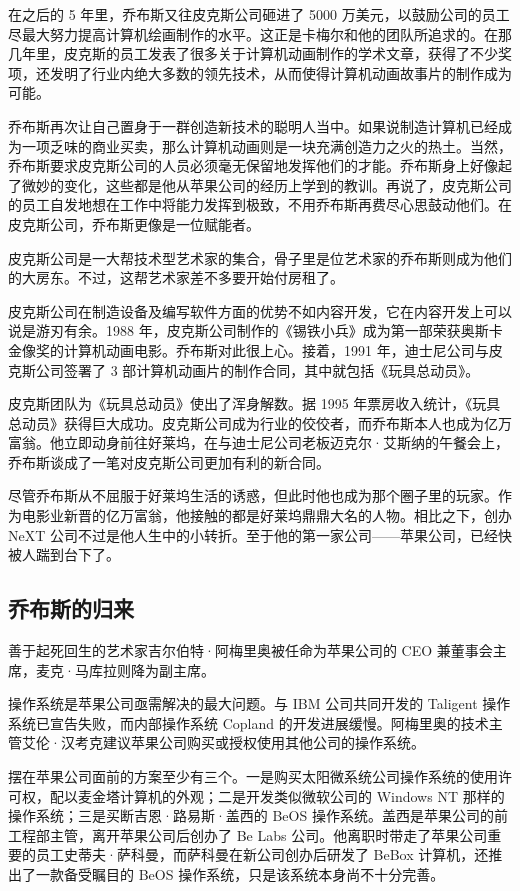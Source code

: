 \documentclass[12pt,UTF8]{ctexbook}
\begin{document}
在之后的 5 年里，乔布斯又往皮克斯公司砸进了 5000 万美元，以鼓励公司的员工尽最大努力提高计算机绘画制作的水平。这正是卡梅尔和他的团队所追求的。在那几年里，皮克斯的员工发表了很多关于计算机动画制作的学术文章，获得了不少奖项，还发明了行业内绝大多数的领先技术，从而使得计算机动画故事片的制作成为可能。

乔布斯再次让自己置身于一群创造新技术的聪明人当中。如果说制造计算机已经成为一项乏味的商业买卖，那么计算机动画则是一块充满创造力之火的热土。当然，乔布斯要求皮克斯公司的人员必须毫无保留地发挥他们的才能。乔布斯身上好像起了微妙的变化，这些都是他从苹果公司的经历上学到的教训。再说了，皮克斯公司的员工自发地想在工作中将能力发挥到极致，不用乔布斯再费尽心思鼓动他们。在皮克斯公司，乔布斯更像是一位赋能者。

皮克斯公司是一大帮技术型艺术家的集合，骨子里是位艺术家的乔布斯则成为他们的大房东。不过，这帮艺术家差不多要开始付房租了。

皮克斯公司在制造设备及编写软件方面的优势不如内容开发，它在内容开发上可以说是游刃有余。1988 年，皮克斯公司制作的《锡铁小兵》成为第一部荣获奥斯卡金像奖的计算机动画电影。乔布斯对此很上心。接着，1991 年，迪士尼公司与皮克斯公司签署了 3 部计算机动画片的制作合同，其中就包括《玩具总动员》。

皮克斯团队为《玩具总动员》使出了浑身解数。据 1995 年票房收入统计，《玩具总动员》获得巨大成功。皮克斯公司成为行业的佼佼者，而乔布斯本人也成为亿万富翁。他立即动身前往好莱坞，在与迪士尼公司老板迈克尔·艾斯纳的午餐会上，乔布斯谈成了一笔对皮克斯公司更加有利的新合同。

尽管乔布斯从不屈服于好莱坞生活的诱惑，但此时他也成为那个圈子里的玩家。作为电影业新晋的亿万富翁，他接触的都是好莱坞鼎鼎大名的人物。相比之下，创办 NeXT 公司不过是他人生中的小转折。至于他的第一家公司——苹果公司，已经快被人踹到台下了。





\subsection{乔布斯的归来}


善于起死回生的艺术家吉尔伯特·阿梅里奥被任命为苹果公司的 CEO 兼董事会主席，麦克·马库拉则降为副主席。

操作系统是苹果公司亟需解决的最大问题。与 IBM 公司共同开发的 Taligent 操作系统已宣告失败，而内部操作系统 Copland 的开发进展缓慢。阿梅里奥的技术主管艾伦·汉考克建议苹果公司购买或授权使用其他公司的操作系统。

摆在苹果公司面前的方案至少有三个。一是购买太阳微系统公司操作系统的使用许可权，配以麦金塔计算机的外观；二是开发类似微软公司的 Windows NT 那样的操作系统；三是买断吉恩·路易斯·盖西的 BeOS 操作系统。盖西是苹果公司的前工程部主管，离开苹果公司后创办了 Be Labs 公司。他离职时带走了苹果公司重要的员工史蒂夫·萨科曼，而萨科曼在新公司创办后研发了 BeBox 计算机，还推出了一款备受瞩目的 BeOS 操作系统，只是该系统本身尚不十分完善。
\end{document}
